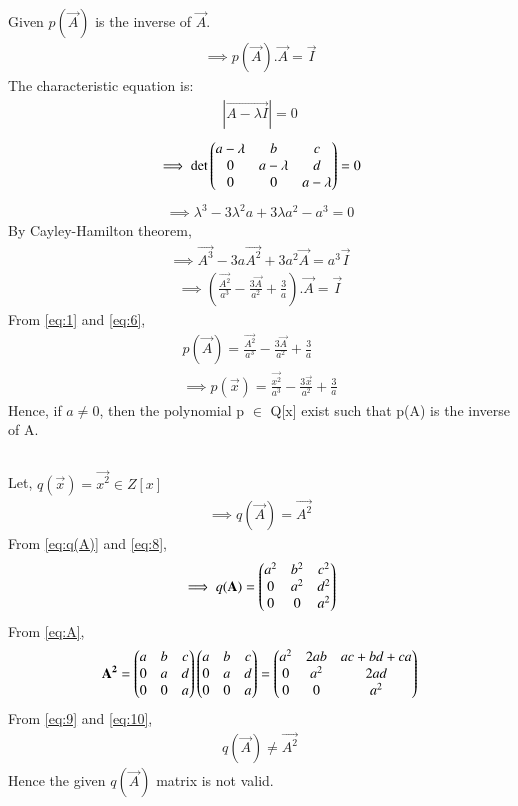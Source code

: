 \documentclass[journal,12pt,twocolumn]{IEEEtran}
\begin{document}
\subsection{} Given $p(\vec{A})$ is the inverse of $\vec{A}$.
\begin{align}
\implies p(\vec{A}).\vec{A}=\vec{I} \label{eq:1}
\end{align}
The characteristic equation is:
\begin{align}
 |\vec{A-\lambda I}|=0 \label{eq:2}
\end{align}
\begin{align}
 \implies \det{\ensuremath{\begin{pmatrix}a-\lambda & b & c \\ 0 & a-\lambda & d \\ 0 & 0 & a-\lambda\end{pmatrix}}}=0 \label{eq:3}
\end{align}
\begin{align}
 \implies \lambda^3-3\lambda^2a+3\lambda a^2 - a^3=0 \label{eq:4}
\end{align}
By Cayley-Hamilton theorem,
\begin{align}
 \implies \vec{A^3}-3a\vec{A^2}+3a^2\vec{A}=a^3\vec{I}  \label{eq:5}
\end{align}
\begin{align}
\implies (\frac{\vec{A^2}}{a^3}-\frac{3\vec{A}}{a^2}+\frac{3}{a}).\vec{A}= \vec{I} \label{eq:6}
\end{align}
From \eqref{eq:1} and \eqref{eq:6},
\begin{align}
p(\vec{A})=\frac{\vec{A^2}}{a^3}-\frac{3\vec{A}}{a^2}+\frac{3}{a} \\ \implies \boxed{p(\vec{x})=\frac{\vec{x^2}}{a^3}-\frac{3\vec{x}}{a^2}+\frac{3}{a}}\label{eq:7}
\end{align}
Hence, if $a\neq 0$, then the polynomial p $\in$ Q[x] exist such that p(A) is the inverse of A.
\subsection{}
Let, $q(\vec{x})=\vec{x^2} \in Z[x]$
\begin{align}
 \implies q(\vec{A})=\vec{A^2}  \label{eq:8}
\end{align}
From \eqref{eq:q(A)} and \eqref{eq:8},
\begin{align}
 \implies q(\mathbf{A})=\begin{pmatrix}a^2 & b^2 & c^2 \\ 0 & a^2 & d^2 \\ 0 & 0 & a^2\end{pmatrix}  \label{eq:9}
\end{align}
From \eqref{eq:A},
\begin{align}
 \mathbf{A^2}=\begin{pmatrix}a & b & c \\ 0 & a & d \\ 0 & 0 & a\end{pmatrix}\begin{pmatrix}a & b & c \\ 0 & a & d \\ 0 & 0 & a\end{pmatrix}=\begin{pmatrix}a^2 & 2ab & ac+bd+ca\\ 0 & a^2 & 2ad\\ 0 & 0 & a^2\end{pmatrix}  \label{eq:10}
\end{align}
From \eqref{eq:9} and \eqref{eq:10}, 
\begin{align}
\boxed{q(\vec{A})\neq \vec{A^2}} \label{eq:W}
\end{align}
Hence the given $q(\vec{A})$ matrix is not valid.
\end{document}
